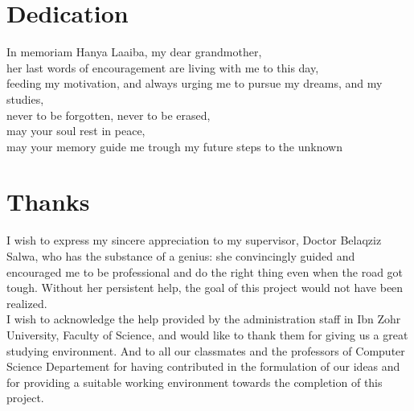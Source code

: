 
\chapter*{Dedication}
\thispagestyle{empty}
%
\begin{center}
  In memoriam Hanya Laaiba, my dear grandmother, ~ \\
  her last words of encouragement are living with me to this day, ~ \\
  feeding my motivation, and always urging me to pursue my dreams, and my studies, ~\\
  never to be forgotten, never to be erased, ~ \\
  may your soul rest in peace, ~ \\
  may your memory guide me trough my future steps to the unknown ~ \\


\end{center}
%
%
%
%
%
%
%
\cleardoublepage%
\chapter*{Thanks}
\thispagestyle{empty}
%
I wish to express my sincere appreciation to my supervisor, Doctor Belaqziz Salwa,
who has the substance of a genius: she convincingly guided and encouraged me to be
professional and do the right thing even when the road got tough. Without her
persistent help, the goal of this project would not have been realized.\\

I wish to acknowledge the help provided by the administration staff in
Ibn Zohr University, Faculty of Science, and would like to thank them for giving us a great studying
environment.
And to all our classmates and the professors of Computer Science Departement for having contributed
in the formulation of our ideas and for providing a suitable working environment towards the completion of
this project.\\


